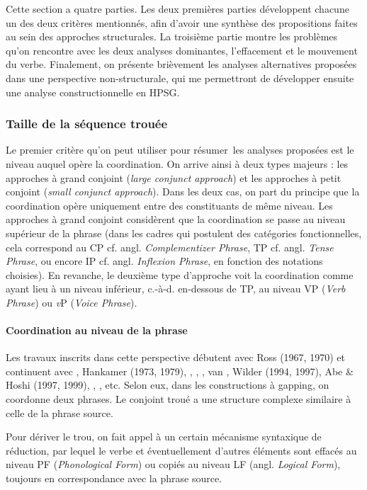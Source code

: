 Cette section a quatre parties. Les deux premières parties développent chacune un des deux critères mentionnés, afin d'avoir une synthèse des propositions faites au sein des approches structurales. La troisième partie montre les problèmes qu'on rencontre avec les deux analyses dominantes, l'effacement et le mouvement du verbe. Finalement, on présente brièvement les analyses alternatives proposées dans une perspective non-structurale, qui me permettront de développer ensuite une analyse constructionnelle en HPSG.

\subsubsection{Taille de la séquence trouée}
Le premier critère qu'on peut utiliser pour résumer~les analyses proposées est le niveau auquel opère la coordination. On arrive ainsi à deux types majeurs : les approches à grand conjoint (\textit{large conjunct approach}) et les approches à petit conjoint (\textit{small conjunct approach}). Dans les deux cas, on part du principe que la coordination opère uniquement entre des constituants de même niveau. Les approches à grand conjoint considèrent que la coordination se passe au niveau supérieur de la phrase (dans les cadres qui postulent des catégories fonctionnelles, cela correspond au CP cf. angl. \textit{Complementizer Phrase}, TP cf. angl. \textit{Tense Phrase}, ou encore IP cf. angl. \textit{Inflexion Phrase}, en fonction des notations choisies). En revanche, le deuxième type d'approche voit la coordination comme ayant lieu à un niveau inférieur, c.-à-d. en-dessous de TP, au niveau VP (\textit{Verb Phrase}) ou \textit{v}P (\textit{Voice Phrase}).  

\paragraph[Coordination au niveau de la phrase]{Coordination au niveau de la phrase}
Les travaux inscrits dans cette perspective débutent avec Ross (1967, 1970) et continuent avec \citet{Jackendoff1971}, Hankamer (1973, 1979), \citet{Stillings1975}, \citet{Sag1976}, \citet{Neijt1979}, van \citet{Oirsouw1987}, Wilder (1994, 1997), Abe \& Hoshi (1997, 1999), \citet{Kim1997}, \citet{Hartmann2000}, etc. Selon eux, dans les constructions à gapping, on coordonne deux phrases. Le conjoint troué a une structure complexe similaire à celle de la phrase source. 

Pour dériver le trou, on fait appel à un certain mécanisme syntaxique de réduction, par lequel le verbe et éventuellement d'autres éléments sont effacés au niveau PF (\textit{Phonological Form}) ou copiés au niveau LF (angl. \textit{Logical Form}), toujours en correspondance avec la phrase source. 

